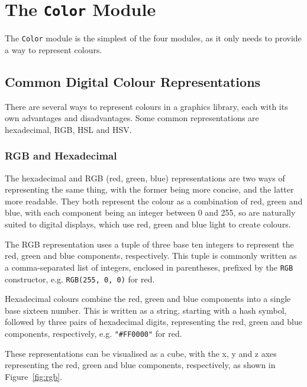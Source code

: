 \documentclass[../main.tex]{subfiles}
\begin{document}
    \section{The \texttt{Color}
        Module} The \texttt{Color} module is the simplest of the four modules, as it
            only needs to provide a way to represent colours.

        \subsection{Common Digital Colour Representations}
            There are several ways to represent colours in a graphics library, each with
                its own advantages and disadvantages.
            Some common representations are hexadecimal, RGB, HSL and HSV.

            \subsubsection{RGB and Hexadecimal}
                The hexadecimal and RGB (red, green, blue) representations are two ways of
                    representing the same thing, with the former being more concise, and the latter
                    more readable.
                They both represent the colour as a combination of red, green and blue, with
                    each component being an integer between 0 and 255, so are naturally suited to
                    digital displays, which use red, green and blue light to create colours.

                The RGB representation uses a tuple of three base ten integers to represent the
                    red, green and blue components, respectively.
                This tuple is commonly written as a comma-separated list of integers, enclosed
                    in parentheses, prefixed by the \texttt{RGB} constructor, e.g. \texttt{RGB(255,
                        0, 0)} for red.

                Hexadecimal colours combine the red, green and blue components into a single
                    base sixteen number.
                This is written as a string, starting with a hash symbol, followed by three
                    pairs of hexadecimal digits, representing the red, green and blue components,
                    respectively, e.g. \texttt{"\#FF0000"} for red.

                These representations can be visualised as a cube, with the x, y and z axes
                    representing the red, green and blue components, respectively, as shown in
                    Figure~\ref{fig:rgb}.
\end{document}
